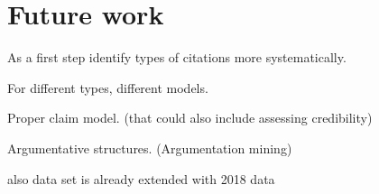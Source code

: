 \chapter{Future work}
As a first step identify types of citations more systematically.

For different types, different models.

Proper claim model. (that could also include assessing credibility\cite{Popat2016})

Argumentative structures. (Argumentation mining\cite{Stab2016,Lippi2016,Habernal2017})

also data set is already extended with 2018 data
